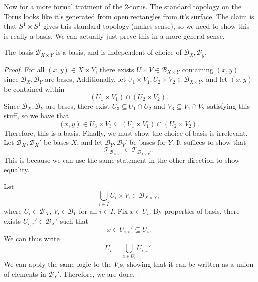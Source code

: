 Now for a more formal tratment of the 2-torus. The standard topology on the Torus looks like it's generated from open rectangles from it's surface. The claim is that $S^1\times S^1$ gives this standard topology (makes sense), so we need to show this is really a basis. We can actually just prove this in a more general sense.
\begin{theorem}\label{thm:2.1}
	The basis $\mathcal{B}_{X\times Y} $ is a basis, and is independent of choice of $\mathcal{B}_X, \mathcal{B}_y$.
\end{theorem}
\begin{proof}
	For all $(x,y)\in X\times Y$, there exists $U\times V\in \mathcal{B}_{X\times Y} $ containing $(x,y)$ since $\mathcal{B}_X,\mathcal{B}_Y$ are bases, Additionally, let $U_1\times V_1,U_2\times V_2\in \mathcal{B}_{X\times Y} $, and let $(x,y)$ be contained within
	\[
		(U_1\times V_1)\cap (U_2\times V_2)
	.\]
	Since $\mathcal{B}_X,\mathcal{B}_Y$ are bases, there exist $U_3\subseteq U_1 \cap U_2$ and $V_3 \subseteq V_1 \cap V_2$ satisfying this stuff, so we have that
	\[
		(x,y)\in U_3 \times V_3 \subseteq (U_1\times V_1)\cap (U_2\times V_2)
	.\]
	Therefore, this is a basis. Finally, we must show the choice of basis is irrelevant. Let $\mathcal{B}_X,\mathcal{B}_X'$ be bases $X$, and let $\mathcal{B}_Y,\mathcal{B}_Y'$ be bases for $Y$. It suffices to show that
	\[
		\mathcal{T}_{\mathcal{B}_{X\times Y} } \subseteq \mathcal{T}_{\mathcal{B}_{X\times Y}'} 
	.\]
	This is because we can use the same statement in the other direction to show equality.

	Let
	\[
		\bigcup_{i\in I} U_i\times V_i \in \mathcal{B}_{X\times Y} 
	,\]
	where $U_i\in \mathcal{B}_X$, $V_i\in \mathcal{B}_Y$ for all $i\in I$. Fix $x\in U_i$. By properties of basis, there exists $U_{i,x}'\in \mathcal{B}_X'$ such that
	\[
		x\in U_{i,x}' \subseteq U_i
	.\]
	We can thus write
	\[
		U_i = \bigcup_{x\in U_i} U_{i,x}'
	.\]
	We can apply the same logic to the $V_i$s, showing that it can be written as a union of elements in $\mathcal{B}_Y'$. Therefore, we are done.
\end{proof}

